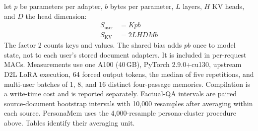 let $p$ be parameters per adapter, $b$ bytes per parameter, $L$ layers,
$H$ KV heads, and $D$ the head dimension:
\begin{align}
S_{\mathrm{user}}&=Kpb\label{eq:storage-adapter}\\
S_{\mathrm{KV}}&=2LHDMb\label{eq:storage-kv}
\end{align}
The factor 2 counts keys and values. The shared bias adds $pb$ once to
model state, not to each user's stored document adapters. It is included in
per-request MACs. Measurements use one A100 (40\,GB), PyTorch 2.9.0+cu130, upstream D2L LoRA
execution, 64 forced output tokens, the median of five repetitions, and multi-user
batches of 1, 8, and 16 distinct four-passage memories.
Compilation is a write-time cost and is reported separately.
Factual-QA intervals are paired source-document bootstrap intervals with
10,000 resamples after averaging within each source. PersonaMem uses the
4,000-resample persona-cluster procedure above. Tables identify their averaging unit.
